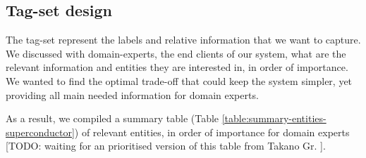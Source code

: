 \documentclass[a4paper,10pt]{article}
\begin{document}
\subsection{Tag-set design}
The tag-set represent the labels and relative information that we want to capture. We discussed with domain-experts, the end clients of our system, what are the relevant information and entities they are interested in, in order of importance. We wanted to find the optimal trade-off that could keep the system simpler, yet providing all main needed information for domain experts. 

As a result, we compiled a summary table (Table \ref{table:summary-entities-superconductor}) of relevant entities, in order of importance for domain experts [TODO: waiting for an prioritised version of this table from Takano Gr. ].
\end{document}
